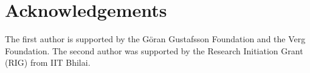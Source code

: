 \documentclass[12pt]{article}
\newcommand{\ls}{\mathsf{ls}}
\newcommand{\Des}{\operatorname{Des}}
\newcommand{\s}{\mathfrak{S}}
\theoremstyle{definition}
\begin{document}


\section*{Acknowledgements}

The first author is supported by the Göran Gustafsson Foundation and the Verg Foundation.  The second author was supported by the Research Initiation Grant (RIG) from IIT Bhilai.



\end{document}
